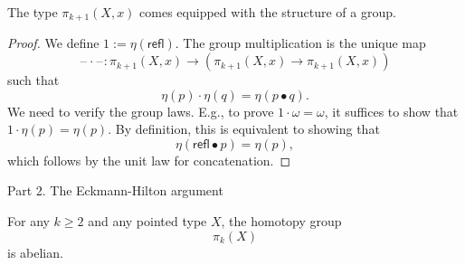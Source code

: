 \documentclass[handout]{beamer}
\newcommand{\refl}{\mathsf{refl}}
\newcommand{\blank}{\mathord{\hspace{1pt}\text{--}\hspace{1pt}}}
\begin{document}
\begin{frame}
  \begin{lemma}
    The type $\pi_{k+1}(X,x)$ comes equipped with the structure of a group.
  \end{lemma}\pause

  \begin{proof}
    We define $1:=\eta(\refl)$. The group multiplication is the unique map
    \begin{equation*}
      \blank\cdot\blank : \pi_{k+1}(X,x)\to (\pi_{k+1}(X,x)\to \pi_{k+1}(X,x))
    \end{equation*}
    such that
    \begin{equation*}
      \eta(p)\cdot\eta(q)=\eta(p\bullet q).
    \end{equation*}
    We need to verify the group laws. E.g., to prove $1\cdot \omega = \omega$, it suffices to show that $1\cdot\eta(p)=\eta(p)$. By definition, this is equivalent to showing that
    \begin{equation*}
      \eta(\refl\bullet p)=\eta(p),
    \end{equation*}
    which follows by the unit law for concatenation.
  \end{proof}
\end{frame}

\begin{frame}
  \huge{Part 2. The Eckmann-Hilton argument}
\end{frame}

\begin{frame}
  \begin{theorem}
    For any $k\geq 2$ and any pointed type $X$, the homotopy group
    \begin{equation*}
      \pi_k(X)
    \end{equation*}
    is abelian.
  \end{theorem}
\end{frame}
\end{document}
